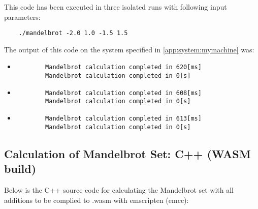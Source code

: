 This code has been executed in three isolated runs with following input parameters:
\begin{lstlisting}
    ./mandelbrot -2.0 1.0 -1.5 1.5
\end{lstlisting}

The output of this code on the system specified in \ref{app:system:mymachine} was:
\begin{itemize}
    \item \begin{lstlisting}
        Mandelbrot calculation completed in 620[ms]
        Mandelbrot calculation completed in 0[s]
    \end{lstlisting}
    \item \begin{lstlisting}
        Mandelbrot calculation completed in 608[ms]
        Mandelbrot calculation completed in 0[s]
    \end{lstlisting}
    \item \begin{lstlisting}
        Mandelbrot calculation completed in 613[ms]
        Mandelbrot calculation completed in 0[s]
    \end{lstlisting}
\end{itemize}

\subsection{Calculation of Mandelbrot Set: C++ (WASM build)}
\label{app:code:mandelbrot2}
Below is the C++ source code for calculating the Mandelbrot set with all additions to be complied to .wasm with emscripten (emcc):

